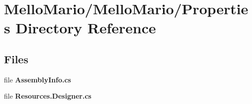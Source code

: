 \section{Mello\+Mario/\+Mello\+Mario/\+Properties Directory Reference}
\label{dir_6da8ce10d4c2f2776a32d434f78c738d}
\subsection*{Files}
\begin{DoxyCompactItemize}
\item 
file \textbf{ Assembly\+Info.\+cs}
\item 
file \textbf{ Resources.\+Designer.\+cs}
\end{DoxyCompactItemize}

